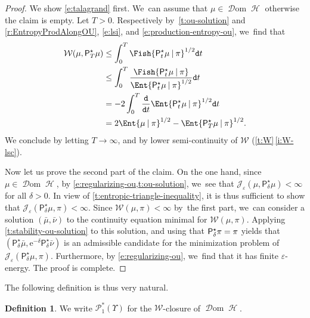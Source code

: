 \documentclass[JEP,XML,SOM,Unicode,published]{cedram}
\theoremstyle{definition}
\newtheorem{definition}[theorem]{Definition}
\theoremstyle{remark}
\newcommand{\given}[1][]{%
\nonscript\:#1\vert
\allowbreak
\nonscript\:
\mathopen{}}
\DeclareMathOperator{\ent}{\mathcal{H}}
\DeclareMathOperator{\dom}{\mathscr{D}om}
\begin{document}
\begin{proof}
We show \cref{e:talagrand} first. We~can assume that $\mu \in \dom \ent$ otherwise the claim is empty.
Let $T > 0$.
Respectively by~\cref{t:ou-solution} and \cref{r:EntropyProdAlongOU}, \cref{e:lsi}, and \cref{e:production-entropy-ou}, we~find that
\begin{equation*}
\begin{split}
\mathcal{W}(\mu, \mathsf{P}_{T}^{\star} \mu) &\leq \int_{0}^{T} \Fish{ \mathsf{P}_{t}^{\star} \mu \given \pi }^{1/2} \mathtt{d} t \\
& \leq \int_{0}^{T} \frac{\Fish{ \mathsf{P}^{\star}_{t} \mu \given \pi }}{\Ent{\mathsf{P}^{\star}_{t} \mu \given \pi }^{1/2}} \mathtt{d} t
\\
& = - 2\int_{0}^{T} \frac{\mathtt{d}}{\mathtt{d} t} \Ent{ \mathsf{P}_{t}^{\star} \mu \given \pi }^{1/2} \mathtt{d} t \\
&= 2\Ent{ \mu \given \pi }^{1/2} - \Ent{ \mathsf{P}_{T}^{\star} \mu \given \pi }^{1/2}.
\end{split}
\end{equation*}
We conclude by letting $T \to \infty$, and by lower semi-continuity of $\mathcal{W}$ (\cref{t:W}\,\cref{i:W-lsc}).

Now let us prove the second part of the claim.
On the one hand, since $\mu \in \dom \ent$, by \cref{e:regularizing-ou,t:ou-solution}, we~see that $\mathscr{J}_{\varepsilon}(\mu, \mathsf{P}_{\delta}^{\star} \mu) < \infty$ for all $\delta > 0$.
In view of \cref{t:entropic-triangle-inequality}, it is thus sufficient to show that $\mathscr{J}_{\varepsilon}(\mathsf{P}_{\delta}^{\star}\mu, \pi) \!<\! \infty$.
Since $\mathcal{W}(\mu, \pi) \!<\! \infty$ by~the first part, we~can consider a solution $(\bar{\mu}, \bar{\nu})$ to the continuity equation minimal for $\mathcal{W}(\mu, \pi)$.
Applying \cref{t:stability-ou-solution} to this solution, and using that $\mathsf{P}_{\delta}^{\star} \pi =\nobreak \pi$ yields that $(\mathsf{P}_{\delta}^{\star}\bar{\mu}, \mathrm{e}^{-\delta}\mathsf{P}_{\delta}^{\star} \bar{\nu})$ is an admissible candidate for the minimization problem of $\mathscr{J}_{\varepsilon}(\mathsf{P}_{\delta}^{\star}\mu, \pi)$.
Furthermore, by \cref{e:regularizing-ou}, we~find that it has finite $\varepsilon$-energy.
The proof is complete.
\end{proof}

The following definition is thus very natural.
\begin{definition}
We write $\mathscr{P}_{1}^{*}(\varUpsilon)$ for the $\mathcal{W}$-closure of $\dom \ent$.
\end{definition}
\end{document}
